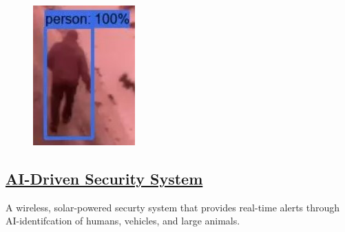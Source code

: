 \documentclass[
	10pt, %
]{FreemanCV}
\begin{document}
\begin{paracol}{2}

\setlength\intextsep{20pt} %
\begin{figure} %
	\hspace*{-20pt} %
	\vspace*{-20pt}
    \includegraphics[scale=0.6]{security_system} %
\end{figure}

\vspace*{-15pt} %
\leavevmode\subsection{\href{https://github.com/jfcbooth/security_system}{AI-Driven Security System \scriptsize\faLink}}


A wireless, solar-powered securty system that provides real-time alerts through AI-identifcation of humans, vehicles, and large animals.





\end{paracol}
\end{document}
